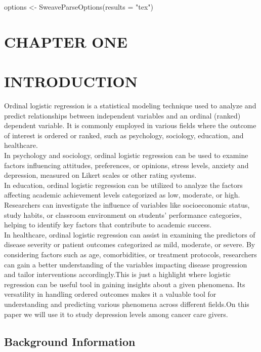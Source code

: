 \documentclass[12pt]{article}
\numberwithin{equation}{section}
\begin{document}

options <- SweaveParseOptions(results = "tex")

\section*{CHAPTER ONE}
\section*{INTRODUCTION}
\setcounter{section}{1}
\setcounter{subsection}{0}


Ordinal logistic regression is a statistical modeling technique used to analyze and predict relationships between independent variables and an ordinal (ranked) dependent variable. It is commonly employed in various fields where the outcome of interest is ordered or ranked, such as psychology, sociology, education, and healthcare.\\
In psychology and sociology, ordinal logistic regression can be used to examine factors influencing attitudes, preferences, or opinions, stress levels, anxiety and depression, measured on Likert scales or other rating systems.\\
In education, ordinal logistic regression can be utilized to analyze the factors affecting academic achievement levels categorized as low, moderate, or high. Researchers can investigate the influence of variables like socioeconomic status, study habits, or classroom environment on students' performance categories, helping to identify key factors that contribute to academic success.\\
In healthcare, ordinal logistic regression can assist in examining the predictors of disease severity or patient outcomes categorized as mild, moderate, or severe. By considering factors such as age, comorbidities, or treatment protocols, researchers can gain a better understanding of the variables impacting disease progression and tailor interventions accordingly.This is just a highlight where logistic regression can be useful tool in gaining insights about a given phenomena. Its versatility in handling ordered outcomes makes it a valuable tool for understanding and predicting various phenomena across different fields.On this paper we will use it to study depression levels among cancer care givers.

\subsection{Background Information}
\end{document}
